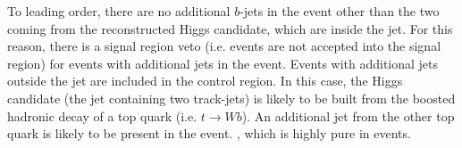 To leading order, there are no additional $b$-jets in the event other than the two coming from the reconstructed Higgs candidate, which are inside the \largeR jet.
For this reason, there is a signal region veto (i.e. events are not accepted into the signal region) for events with additional \btagged jets in the event.
Events with additional \btagged jets outside the \largeR jet are included in the control region.
In this case, the Higgs candidate (the \largeR jet containing two \btagged track-jets) is likely to be built from the boosted hadronic decay of a top quark (i.e. $t \rightarrow Wb$).
An additional \btagged jet from the other top quark is likely to be present in the event.
, which is highly pure in \ttbar events.


  

